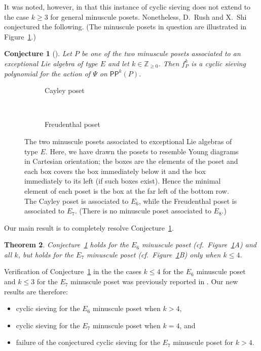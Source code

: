 \documentclass[12pt]{amsart}
\newtheorem{theorem}{Theorem}[section]
\newtheorem{conjecture}[theorem]{Conjecture}
\theoremstyle{definition}
\theoremstyle{remark}
\numberwithin{equation}{section}
\newcommand{\pp}{\ensuremath{\mathsf{PP}}}
\begin{document}
It was noted, however, in \cite{Rush.Shi} that this instance of cyclic sieving does not extend to the case $k\geq 3$ for general minuscule posets.
Nonetheless, D.~Rush and X.~Shi conjectured the following. (The minuscule posets in question are illustrated in Figure~\ref{fig:min_poset_E}.)
\begin{conjecture}[{\cite[Conjecture~11.1]{Rush.Shi}}]\label{conj:rush.shi}
Let $P$ be one of the two minuscule posets associated to an exceptional Lie algebra of type $E$ and let $k \in \mathbb{Z}_{\geq 0}$. Then $f_P^k$ is a cyclic sieving polynomial for the action of $\Psi$ on $\pp^k(P)$.
\end{conjecture}

\begin{figure}[h]
	\begin{subfigure}[b]{0.27\textwidth}
		\centering
		\caption{Cayley poset}
	\end{subfigure} \\ \vspace{4mm}
	\begin{subfigure}[b]{0.27\textwidth}
		\centering
		\caption{Freudenthal poset}
	\end{subfigure}
\caption{The two minuscule posets associated to exceptional Lie algebras of type $E$. Here, we have drawn the posets to resemble Young diagrams in Cartesian orientation; the boxes are the elements of the poset and each box covers the box immediately below it and the box immediately to its left (if such boxes exist). Hence the minimal element of each poset is the box at the far left of the bottom row.
 The Cayley poset is associated to $E_6$, while the Freudenthal poset is associated to $E_7$. (There is no minuscule poset associated to $E_8$.)}
\label{fig:min_poset_E}
\end{figure}

Our main result is to completely resolve Conjecture~\ref{conj:rush.shi}. 
\begin{theorem}\label{thm:exceptionals}
Conjecture~\ref{conj:rush.shi} holds for the $E_6$ minuscule poset (cf.~Figure~\ref{fig:min_poset_E}A) and all $k$, but holds for the $E_7$ minuscule poset (cf.~Figure~\ref{fig:min_poset_E}B) only when $k \leq 4$. 
\end{theorem}  
Verification of Conjecture~\ref{conj:rush.shi} in the the cases $k \leq 4$ for the $E_6$ minuscule poset and $k \leq 3$ for the $E_7$ minuscule poset was previously reported in \cite{Rush.Shi}. Our new results are therefore:
\begin{itemize}
\item cyclic sieving for the $E_6$ minuscule poset when $k > 4$,
\item cyclic sieving for the $E_7$ minuscule poset when $k = 4$, and
\item failure of the conjectured cyclic sieving for the $E_7$ minuscule poset for $k > 4$.
\end{itemize}
\end{document}
